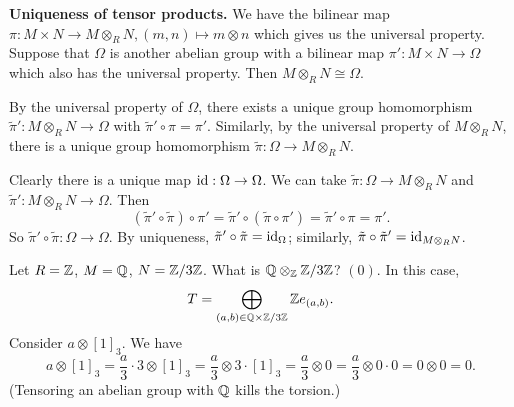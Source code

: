 {\bf Uniqueness of tensor products.} We have the bilinear map 
$\pi : M \times N \to M \otimes_R N, (m, n) \mapsto m \otimes n$ 
which gives us the universal property. Suppose that $\Omega$ is 
another abelian group with a bilinear map $\pi' : M \times N 
\to \Omega$ which also has the universal property. Then 
$M \otimes_R N \cong \Omega$. 

\begin{pf}
    By the universal property of $\Omega$, there exists a unique group 
    homomorphism $\tilde\pi' : M \otimes_R N \to \Omega$ with $\tilde\pi' \circ \pi = \pi'$. 
    Similarly, by the universal property of $M \otimes_R N$, there 
    is a unique group homomorphism $\tilde\pi : \Omega \to M \otimes_R N$. 

    Clearly there is a unique map $\operatorname{id} : \Omega \to \Omega$. 
    We can take $\tilde\pi : \Omega \to M \otimes_R N$ 
    and $\tilde\pi' : M \otimes_R N \to \Omega$. Then 
    \[ (\tilde\pi' \circ \tilde\pi) \circ \pi' 
    = \tilde\pi' \circ (\tilde\pi \circ \pi') 
    = \tilde\pi' \circ \pi = \pi'. \] 
    So $\tilde\pi' \circ \tilde\pi : \Omega \to \Omega$. By uniqueness, 
    $\tilde\pi' \circ \tilde\pi = \operatorname{id}_\Omega$; similarly, 
    $\tilde\pi \circ \tilde\pi' = \operatorname{id}_{M\otimes_R N}$. 
\end{pf}

\begin{exmp}{}
    Let $R = \mathbb{Z}$, $M = \mathbb{Q}$, $N = \mathbb{Z}/3\mathbb{Z}$. What is 
    $\mathbb{Q} \otimes_{\mathbb{Z}} \mathbb{Z}/3\mathbb{Z}$? $(0)$. In this case, 
    \[ T = \bigoplus_{(a, b) \in \mathbb{Q} \times \mathbb{Z}/3\mathbb{Z}} \mathbb{Z} e_{(a, b)}. \] 
    Consider $a \otimes [1]_3$. We have 
    \[ a \otimes [1]_3 = \frac{a}3 \cdot 3 \otimes [1]_3 
    = \frac{a}3 \otimes 3 \cdot [1]_3 = \frac{a}3 \otimes 0
    = \frac{a}3 \otimes 0 \cdot 0 = 0 \otimes 0 = 0. \] 
    (Tensoring an abelian group with $\mathbb{Q}$ kills the torsion.)
\end{exmp}

